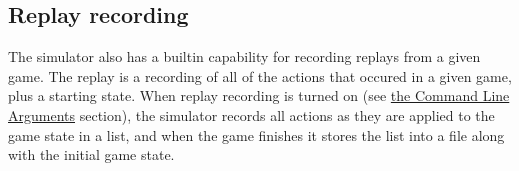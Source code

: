 \subsection{Replay recording}

The simulator also has a builtin capability for recording replays from a given game. The replay is a recording of all of the actions that occured in a given game, plus a starting state. When replay recording is turned on (see \hyperref[cmd-args]{the Command Line Arguments} section), the simulator records all actions as they are applied to the game state in a list, and when the game finishes it stores the list into a file along with the initial game state.

